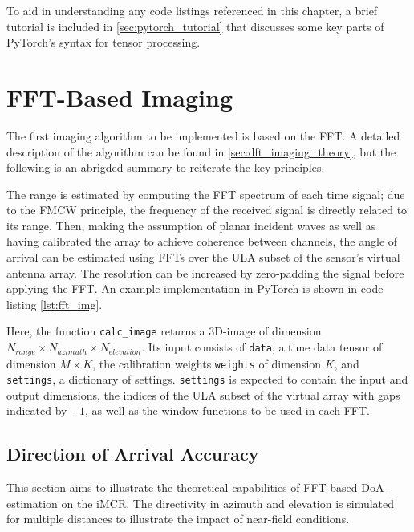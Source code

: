 To aid in understanding any code listings referenced in this chapter,
a brief tutorial is included in \autoref{sec:pytorch_tutorial}
that discusses some key parts of PyTorch's syntax for tensor processing.

\section{FFT-Based Imaging}
\label{sec:fft_imaging}
The first imaging algorithm to be implemented is based on the FFT.
A detailed description of the algorithm can be found in \autoref{sec:dft_imaging_theory},
but the following is an abrigded summary to reiterate the key principles.

The range is estimated by computing the FFT spectrum of each time signal;
due to the FMCW principle, the frequency of the received signal is directly related to its range.
Then, making the assumption of planar incident waves
as well as having calibrated the array to achieve coherence between channels,
the angle of arrival can be estimated using FFTs over the ULA subset of the sensor's virtual antenna array.
The resolution can be increased by zero-padding the signal before applying the FFT.
An example implementation in PyTorch is shown in code listing \ref{lst:fft_img}.

Here, the function \verb|calc_image| returns a 3D-image of dimension $N_{range} \times N_{azimuth} \times N_{elevation}$.
Its input consists of \verb|data|, a time data tensor of dimension $M \times K$,
the calibration weights \verb|weights| of dimension $K$, and \verb|settings|, a dictionary of settings.
\verb|settings| is expected to contain the input and output dimensions,
the indices of the ULA subset of the virtual array with gaps indicated by $-1$,
as well as the window functions to be used in each FFT.

\subsection{Direction of Arrival Accuracy}
\label{sec:fft_doa}
This section aims to illustrate the theoretical capabilities of FFT-based DoA-estimation on the iMCR.
The directivity in azimuth and elevation is simulated for multiple distances to illustrate the impact of near-field conditions.
\\

